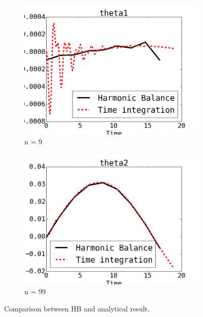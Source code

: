 \documentclass[12pt, a4paper]{extarticle}
\begin{document}
\begin{figure}[H]
	\centering
	\begin{subfigure}[h]{8.0 cm}
		\includegraphics[width=8.0 cm]{figure/P11.png}
		\caption{n = 9}
	\end{subfigure}
	\begin{subfigure}[h]{8.0 cm}
        \includegraphics[width=8.0 cm]{figure/P12.png}
		\caption{n = 99}
    \end{subfigure}
    \caption{Comparison between HB and analytical result.}
    \label{fig:Res1}
\end{figure}
\end{document}

